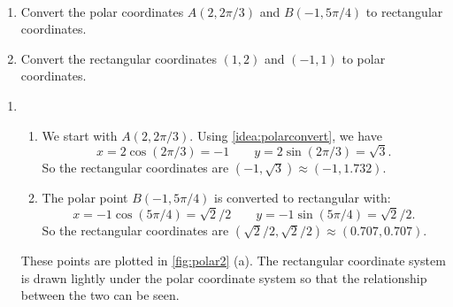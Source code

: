 \begin{example}\label{ex_polar2}
\mbox{}\\[-2\baselineskip]\parbox[t]{\linewidth}{%
\begin{enumerate}
\item		Convert the polar coordinates $A(2,2\pi/3)$ and $B(-1,5\pi/4)$ to rectangular coordinates.
\item		Convert the rectangular coordinates $(1,2)$ and $(-1,1)$ to polar coordinates.
\end{enumerate}}
\solution
\begin{enumerate}
	\item \begin{enumerate}
		\item 
	We start with $A(2,2\pi/3)$. Using \autoref{idea:polarconvert}, we have 
	\[x= 2\cos (2\pi/3) = -1\qquad y = 2\sin (2\pi/3) = \sqrt{3}.\]
	So the rectangular coordinates are $(-1,\sqrt{3}) \approx (-1,1.732)$.
	
	\item The polar point $B(-1,5\pi/4)$ is converted to rectangular with:
	\[x=-1\cos (5\pi/4) = \sqrt{2}/2\qquad y= -1\sin (5\pi/4) = \sqrt{2}/2.\]
	So the rectangular coordinates are $(\sqrt{2}/2,\sqrt{2}/2) \approx (0.707,0.707)$.
	\end{enumerate}
	These points are plotted in \autoref{fig:polar2} (a). The rectangular coordinate system is drawn lightly under the polar coordinate system so that the relationship between the two can be seen.
	

\end{enumerate}
\end{example}
